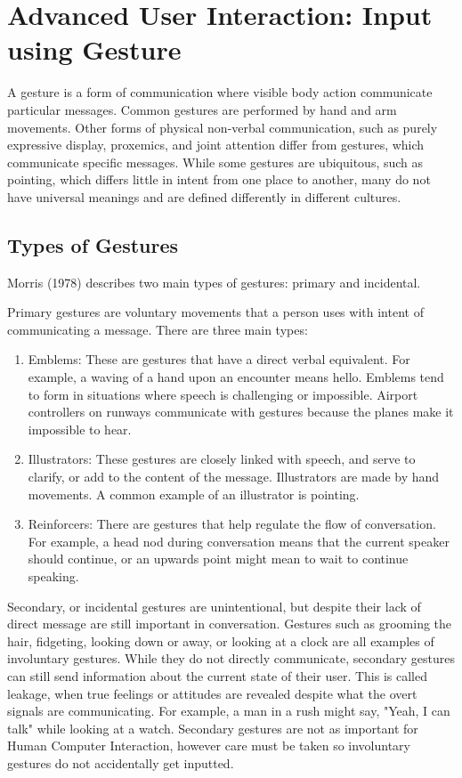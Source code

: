 \documentclass[11pt]{report}
\begin{document}
\section{Advanced User Interaction: Input using Gesture}

A gesture is a form of communication where visible body action communicate particular messages.
Common gestures are performed by hand and arm movements.
Other forms of physical non-verbal communication, such as purely expressive display, proxemics, and joint attention differ from gestures, which communicate specific messages.
While some gestures are ubiquitous, such as pointing, which differs little in intent from one place to another, many do not have universal meanings and are defined differently in different cultures.

\subsection{Types of Gestures}

Morris (1978) describes two main types of gestures: primary and incidental.

Primary gestures are voluntary movements that a person uses with intent of communicating a message. There are three main types:

\begin{enumerate}
\item Emblems: These are gestures that have a direct verbal equivalent. 
For example, a waving of a hand upon an encounter means hello. 
Emblems tend to form in situations where speech is challenging or impossible.
Airport controllers on runways communicate with gestures because the planes make it impossible to hear.

\item Illustrators: These gestures are closely linked with speech, and serve to clarify, or add to the content of the message. 
Illustrators are made by hand movements.
A common example of an illustrator is pointing.

\item Reinforcers: There are gestures that help regulate the flow of conversation.
For example, a head nod during conversation means that the current speaker should continue, or an upwards point might mean to wait to continue speaking.
\end{enumerate}

Secondary, or incidental gestures are unintentional, but despite their lack of direct message are still important in conversation.
Gestures such as grooming the hair, fidgeting, looking down or away, or looking at a clock are all examples of involuntary gestures.
While they do not directly communicate, secondary gestures can still send information about the current state of their user.
This is called leakage, when true feelings or attitudes are revealed despite what the overt signals are communicating.
For example, a man in a rush might say, "Yeah, I can talk" while looking at a watch.
Secondary gestures are not as important for Human Computer Interaction, however care must be taken so involuntary gestures do not accidentally get inputted. 
\end{document}
